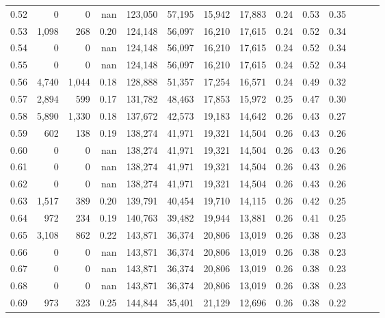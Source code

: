 \begin{tabular}{rrrrrrrrrrrrrr}
0.52 &       0 &      0 &   nan &  123,050 &   57,195 &  15,942 &  17,883 &  0.24 &  0.53 &      0.35 \\
0.53 &   1,098 &    268 &  0.20 &  124,148 &   56,097 &  16,210 &  17,615 &  0.24 &  0.52 &      0.34 \\
0.54 &       0 &      0 &   nan &  124,148 &   56,097 &  16,210 &  17,615 &  0.24 &  0.52 &      0.34 \\
0.55 &       0 &      0 &   nan &  124,148 &   56,097 &  16,210 &  17,615 &  0.24 &  0.52 &      0.34 \\
0.56 &   4,740 &  1,044 &  0.18 &  128,888 &   51,357 &  17,254 &  16,571 &  0.24 &  0.49 &      0.32 \\
0.57 &   2,894 &    599 &  0.17 &  131,782 &   48,463 &  17,853 &  15,972 &  0.25 &  0.47 &      0.30 \\
0.58 &   5,890 &  1,330 &  0.18 &  137,672 &   42,573 &  19,183 &  14,642 &  0.26 &  0.43 &      0.27 \\
0.59 &     602 &    138 &  0.19 &  138,274 &   41,971 &  19,321 &  14,504 &  0.26 &  0.43 &      0.26 \\
0.60 &       0 &      0 &   nan &  138,274 &   41,971 &  19,321 &  14,504 &  0.26 &  0.43 &      0.26 \\
0.61 &       0 &      0 &   nan &  138,274 &   41,971 &  19,321 &  14,504 &  0.26 &  0.43 &      0.26 \\
0.62 &       0 &      0 &   nan &  138,274 &   41,971 &  19,321 &  14,504 &  0.26 &  0.43 &      0.26 \\
0.63 &   1,517 &    389 &  0.20 &  139,791 &   40,454 &  19,710 &  14,115 &  0.26 &  0.42 &      0.25 \\
0.64 &     972 &    234 &  0.19 &  140,763 &   39,482 &  19,944 &  13,881 &  0.26 &  0.41 &      0.25 \\
0.65 &   3,108 &    862 &  0.22 &  143,871 &   36,374 &  20,806 &  13,019 &  0.26 &  0.38 &      0.23 \\
0.66 &       0 &      0 &   nan &  143,871 &   36,374 &  20,806 &  13,019 &  0.26 &  0.38 &      0.23 \\
0.67 &       0 &      0 &   nan &  143,871 &   36,374 &  20,806 &  13,019 &  0.26 &  0.38 &      0.23 \\
0.68 &       0 &      0 &   nan &  143,871 &   36,374 &  20,806 &  13,019 &  0.26 &  0.38 &      0.23 \\
0.69 &     973 &    323 &  0.25 &  144,844 &   35,401 &  21,129 &  12,696 &  0.26 &  0.38 &      0.22 \\

\end{tabular}
